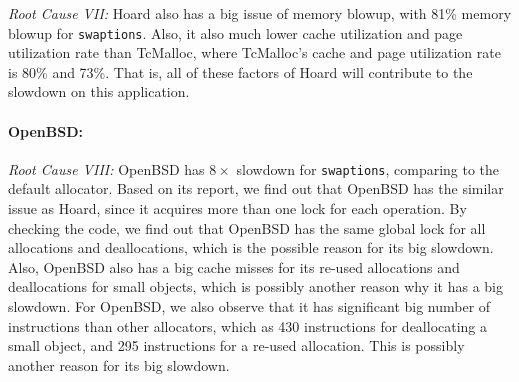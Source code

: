  \textit{Root Cause \RN{7}:} Hoard also has a big issue of memory blowup, with 81\% memory blowup for \texttt{swaptions}. Also, it also much lower cache utilization and page utilization rate than TcMalloc, where TcMalloc's cache and page utilization rate is 80\% and 73\%. That is, all of these factors of Hoard will contribute to the slowdown on this application.
 
\paragraph{OpenBSD:} \textit{Root Cause \RN{8}:}  OpenBSD has $8\times$ slowdown for \texttt{swaptions}, comparing to the default allocator. Based on its report, we find out that OpenBSD has the similar issue as Hoard, since it acquires more than one lock for each operation. By checking the code, we find out that OpenBSD has the same global lock for all allocations and deallocations, which is the possible reason for its big slowdown. Also, OpenBSD also has a big cache misses for its re-used allocations and deallocations for small objects, which is possibly another reason why it has a big slowdown. For OpenBSD, we also observe that it has significant big number of instructions than other allocators, which as 430 instructions for deallocating a small object, and 295 instructions for a re-used allocation. This is possibly another reason for its big slowdown. 







